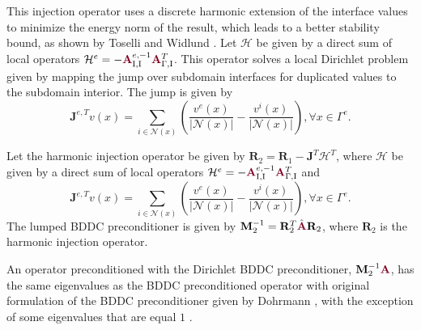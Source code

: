 This injection operator uses a discrete harmonic extension of the interface values to minimize the energy norm of the result, which leads to a better stability bound, as shown by Toselli and Widlund \cite{toselli2006domain}.
Let $\mathcal{H}$ be given by a direct sum of local operators $\mathcal{H}^e = - {\color{burgundy}\mathbf{A}}_{\text{I}, \text{I}}^{e, -1} {\color{burgundy}\mathbf{A}}_{\Gamma, \text{I}}^T$.
This operator solves a local Dirichlet problem given by mapping the jump over subdomain interfaces for duplicated values to the subdomain interior.
The jump is given by
\begin{equation}
\mathbf{J}^{e, T} v \left( x \right) = \sum_{i \in \mathcal{N} \left( x \right)} \left( \frac{v^e \left( x \right)}{\lvert \mathcal{N} \left( x \right) \rvert} - \frac{v^i \left( x \right)}{\lvert \mathcal{N} \left( x \right) \rvert} \right), \forall x \in \Gamma^e.
\end{equation}

\begin{definition}
Let the harmonic injection operator be given by $\mathbf{R}_2 = \mathbf{R}_1 - \mathbf{J}^T \mathcal{H}^T$, where $\mathcal{H}$ be given by a direct sum of local operators $\mathcal{H}^e = - {\color{burgundy}\mathbf{A}}_{\text{I}, \text{I}}^{e, -1} {\color{burgundy}\mathbf{A}}_{\Gamma, \text{I}}^T$ and
\begin{equation}
\mathbf{J}^{e, T} v \left( x \right) = \sum_{i \in \mathcal{N} \left( x \right)} \left( \frac{v^e \left( x \right)}{\lvert \mathcal{N} \left( x \right) \rvert} - \frac{v^i \left( x \right)}{\lvert \mathcal{N} \left( x \right) \rvert} \right), \forall x \in \Gamma^e.
\end{equation}
The lumped BDDC preconditioner is given by $\mathbf{M}^{-1}_2 = \mathbf{R}_2^T \hat{\color{burgundy}\mathbf{A}} \mathbf{R}_2$, where $\mathbf{R}_2$ is the harmonic injection operator.
\label{def:dirichletbddc}
\end{definition}

An operator preconditioned with the Dirichlet BDDC preconditioner, $\mathbf{M}^{-1}_2 {\color{burgundy}\mathbf{A}}$, has the same eigenvalues as the BDDC preconditioned operator with original formulation of the BDDC preconditioner given by Dohrmann \cite{dohrmann2003preconditioner}, with the exception of some eigenvalues that are equal $1$ \cite{li2007use}.
